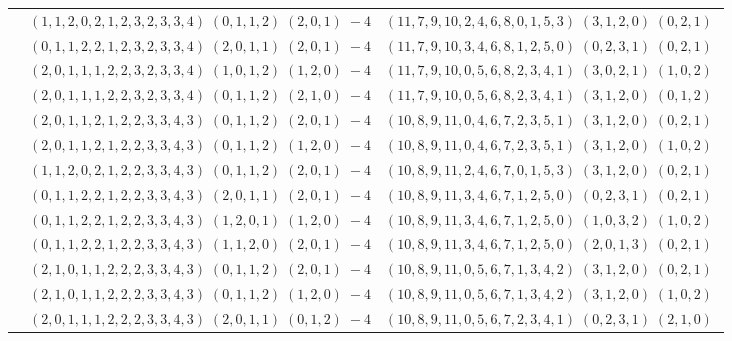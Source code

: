 \documentclass[11pt]{article}
\begin{document}
\begin{longtable}[l]{|c|c|c|}
 \cline{2-3} 
 & $(1 ,1 ,2 ,0 ,2 ,1 ,2 ,3 ,2 ,3 ,3 ,4) \;(0 ,1 ,1 ,2) \;(2 ,0 ,1) \;-4$ & $(11 ,7 ,9 ,10 ,2 ,4 ,6 ,8 ,0 ,1 ,5 ,3) \;(3 ,1 ,2 ,0) \;(0 ,2 ,1) \;$\\ 
 \cline{2-3} 
 & $(0 ,1 ,1 ,2 ,2 ,1 ,2 ,3 ,2 ,3 ,3 ,4) \;(2 ,0 ,1 ,1) \;(2 ,0 ,1) \;-4$ & $(11 ,7 ,9 ,10 ,3 ,4 ,6 ,8 ,1 ,2 ,5 ,0) \;(0 ,2 ,3 ,1) \;(0 ,2 ,1) \;$\\ 
 \cline{2-3} 
 & $(2 ,0 ,1 ,1 ,1 ,2 ,2 ,3 ,2 ,3 ,3 ,4) \;(1 ,0 ,1 ,2) \;(1 ,2 ,0) \;-4$ & $(11 ,7 ,9 ,10 ,0 ,5 ,6 ,8 ,2 ,3 ,4 ,1) \;(3 ,0 ,2 ,1) \;(1 ,0 ,2) \;$\\ 
 \cline{2-3} 
 & $(2 ,0 ,1 ,1 ,1 ,2 ,2 ,3 ,2 ,3 ,3 ,4) \;(0 ,1 ,1 ,2) \;(2 ,1 ,0) \;-4$ & $(11 ,7 ,9 ,10 ,0 ,5 ,6 ,8 ,2 ,3 ,4 ,1) \;(3 ,1 ,2 ,0) \;(0 ,1 ,2) \;$\\ 
 \cline{2-3} 
 & $(2 ,0 ,1 ,1 ,2 ,1 ,2 ,2 ,3 ,3 ,4 ,3) \;(0 ,1 ,1 ,2) \;(2 ,0 ,1) \;-4$ & $(10 ,8 ,9 ,11 ,0 ,4 ,6 ,7 ,2 ,3 ,5 ,1) \;(3 ,1 ,2 ,0) \;(0 ,2 ,1) \;$\\ 
 \cline{2-3} 
 & $(2 ,0 ,1 ,1 ,2 ,1 ,2 ,2 ,3 ,3 ,4 ,3) \;(0 ,1 ,1 ,2) \;(1 ,2 ,0) \;-4$ & $(10 ,8 ,9 ,11 ,0 ,4 ,6 ,7 ,2 ,3 ,5 ,1) \;(3 ,1 ,2 ,0) \;(1 ,0 ,2) \;$\\ 
 \cline{2-3} 
 & $(1 ,1 ,2 ,0 ,2 ,1 ,2 ,2 ,3 ,3 ,4 ,3) \;(0 ,1 ,1 ,2) \;(2 ,0 ,1) \;-4$ & $(10 ,8 ,9 ,11 ,2 ,4 ,6 ,7 ,0 ,1 ,5 ,3) \;(3 ,1 ,2 ,0) \;(0 ,2 ,1) \;$\\ 
 \cline{2-3} 
 & $(0 ,1 ,1 ,2 ,2 ,1 ,2 ,2 ,3 ,3 ,4 ,3) \;(2 ,0 ,1 ,1) \;(2 ,0 ,1) \;-4$ & $(10 ,8 ,9 ,11 ,3 ,4 ,6 ,7 ,1 ,2 ,5 ,0) \;(0 ,2 ,3 ,1) \;(0 ,2 ,1) \;$\\ 
 \cline{2-3} 
 & $(0 ,1 ,1 ,2 ,2 ,1 ,2 ,2 ,3 ,3 ,4 ,3) \;(1 ,2 ,0 ,1) \;(1 ,2 ,0) \;-4$ & $(10 ,8 ,9 ,11 ,3 ,4 ,6 ,7 ,1 ,2 ,5 ,0) \;(1 ,0 ,3 ,2) \;(1 ,0 ,2) \;$\\ 
 \cline{2-3} 
 & $(0 ,1 ,1 ,2 ,2 ,1 ,2 ,2 ,3 ,3 ,4 ,3) \;(1 ,1 ,2 ,0) \;(2 ,0 ,1) \;-4$ & $(10 ,8 ,9 ,11 ,3 ,4 ,6 ,7 ,1 ,2 ,5 ,0) \;(2 ,0 ,1 ,3) \;(0 ,2 ,1) \;$\\ 
 \cline{2-3} 
 & $(2 ,1 ,0 ,1 ,1 ,2 ,2 ,2 ,3 ,3 ,4 ,3) \;(0 ,1 ,1 ,2) \;(2 ,0 ,1) \;-4$ & $(10 ,8 ,9 ,11 ,0 ,5 ,6 ,7 ,1 ,3 ,4 ,2) \;(3 ,1 ,2 ,0) \;(0 ,2 ,1) \;$\\ 
 \cline{2-3} 
 & $(2 ,1 ,0 ,1 ,1 ,2 ,2 ,2 ,3 ,3 ,4 ,3) \;(0 ,1 ,1 ,2) \;(1 ,2 ,0) \;-4$ & $(10 ,8 ,9 ,11 ,0 ,5 ,6 ,7 ,1 ,3 ,4 ,2) \;(3 ,1 ,2 ,0) \;(1 ,0 ,2) \;$\\ 
 \cline{2-3} 
 & $(2 ,0 ,1 ,1 ,1 ,2 ,2 ,2 ,3 ,3 ,4 ,3) \;(2 ,0 ,1 ,1) \;(0 ,1 ,2) \;-4$ & $(10 ,8 ,9 ,11 ,0 ,5 ,6 ,7 ,2 ,3 ,4 ,1) \;(0 ,2 ,3 ,1) \;(2 ,1 ,0) \;$\\ 

\end{longtable}
\end{document}
